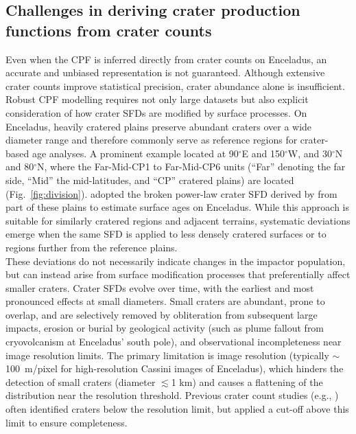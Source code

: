 \documentclass[preprint,11pt,3p,times,authoryear]{elsarticle}
\begin{document}
\subsection{Challenges in deriving crater production functions from crater counts}
Even when the CPF is inferred directly from crater counts on Enceladus, an accurate and unbiased representation is not guaranteed. Although extensive crater counts improve statistical precision, crater abundance alone is insufficient. Robust CPF modelling requires not only large datasets but also explicit consideration of how crater SFDs are modified by surface processes. 
On Enceladus, heavily cratered plains preserve abundant craters over a wide diameter range and therefore commonly serve as reference regions for crater-based age analyses. A prominent example located at 90$^\circ$E and 150$^\circ$W, and 30$^\circ$N and 80$^\circ$N, where the Far-Mid-CP1 to Far-Mid-CP6 units (``Far'' denoting the far side, ``Mid'' the mid-latitudes, and ``CP'' cratered plains) are located (Fig.~\ref{fig:division}). 
\citet{Wong2023} adopted the broken power-law crater SFD derived by \citet{Kirchoff2009} from part of these plains to estimate surface ages on Enceladus. While this approach is suitable for similarly cratered regions and adjacent terrains, systematic deviations emerge when the same SFD is applied to less densely cratered surfaces or to regions further from the reference plains.\\

These deviations do not necessarily indicate changes in the impactor population, but can instead arise from surface modification processes that preferentially affect smaller craters. Crater SFDs evolve over time, with the earliest and most pronounced effects at small diameters. Small craters are abundant, prone to overlap, and are selectively removed by obliteration from subsequent large impacts, erosion or burial by geological activity (such as plume fallout from cryovolcanism at Enceladus’ south pole), and observational incompleteness near image resolution limits. The primary limitation is image resolution (typically $\sim$100~m/pixel for high-resolution Cassini images of Enceladus), which hinders the detection of small craters (diameter $\lesssim$1 km) and causes a flattening of the distribution near the resolution threshold. Previous crater count studies (e.g., \citealt{Kirchoff2009, Kinczyk2024}) often identified craters below the resolution limit, but applied a cut-off above this limit to ensure completeness. \\
\end{document}
